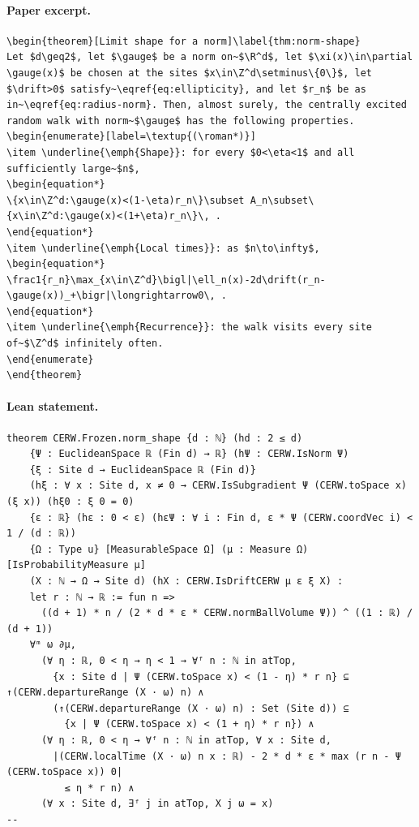\paragraph{Paper excerpt.}
\begin{verbatim}
\begin{theorem}[Limit shape for a norm]\label{thm:norm-shape}
Let $d\geq2$, let $\gauge$ be a norm on~$\R^d$, let $\xi(x)\in\partial \gauge(x)$ be chosen at the sites $x\in\Z^d\setminus\{0\}$, let $\drift>0$ satisfy~\eqref{eq:ellipticity}, and let $r_n$ be as in~\eqref{eq:radius-norm}. Then, almost surely, the centrally excited random walk with norm~$\gauge$ has the following properties.
\begin{enumerate}[label=\textup{(\roman*)}]
\item \underline{\emph{Shape}}: for every $0<\eta<1$ and all sufficiently large~$n$,
\begin{equation*}
\{x\in\Z^d:\gauge(x)<(1-\eta)r_n\}\subset A_n\subset\{x\in\Z^d:\gauge(x)<(1+\eta)r_n\}\, .
\end{equation*}
\item \underline{\emph{Local times}}: as $n\to\infty$,
\begin{equation*}
\frac1{r_n}\max_{x\in\Z^d}\bigl|\ell_n(x)-2d\drift(r_n-\gauge(x))_+\bigr|\longrightarrow0\, .
\end{equation*}
\item \underline{\emph{Recurrence}}: the walk visits every site of~$\Z^d$ infinitely often.
\end{enumerate}
\end{theorem}
\end{verbatim}
\paragraph{Lean statement.}
\begin{verbatim}
theorem CERW.Frozen.norm_shape {d : ℕ} (hd : 2 ≤ d)
    {Ψ : EuclideanSpace ℝ (Fin d) → ℝ} (hΨ : CERW.IsNorm Ψ)
    {ξ : Site d → EuclideanSpace ℝ (Fin d)}
    (hξ : ∀ x : Site d, x ≠ 0 → CERW.IsSubgradient Ψ (CERW.toSpace x) (ξ x)) (hξ0 : ξ 0 = 0)
    {ε : ℝ} (hε : 0 < ε) (hεΨ : ∀ i : Fin d, ε * Ψ (CERW.coordVec i) < 1 / (d : ℝ))
    {Ω : Type u} [MeasurableSpace Ω] (μ : Measure Ω) [IsProbabilityMeasure μ]
    (X : ℕ → Ω → Site d) (hX : CERW.IsDriftCERW μ ε ξ X) :
    let r : ℕ → ℝ := fun n =>
      ((d + 1) * n / (2 * d * ε * CERW.normBallVolume Ψ)) ^ ((1 : ℝ) / (d + 1))
    ∀ᵐ ω ∂μ,
      (∀ η : ℝ, 0 < η → η < 1 → ∀ᶠ n : ℕ in atTop,
        {x : Site d | Ψ (CERW.toSpace x) < (1 - η) * r n} ⊆ ↑(CERW.departureRange (X · ω) n) ∧
        (↑(CERW.departureRange (X · ω) n) : Set (Site d)) ⊆
          {x | Ψ (CERW.toSpace x) < (1 + η) * r n}) ∧
      (∀ η : ℝ, 0 < η → ∀ᶠ n : ℕ in atTop, ∀ x : Site d,
        |(CERW.localTime (X · ω) n x : ℝ) - 2 * d * ε * max (r n - Ψ (CERW.toSpace x)) 0|
          ≤ η * r n) ∧
      (∀ x : Site d, ∃ᶠ j in atTop, X j ω = x)
--
\end{verbatim}
